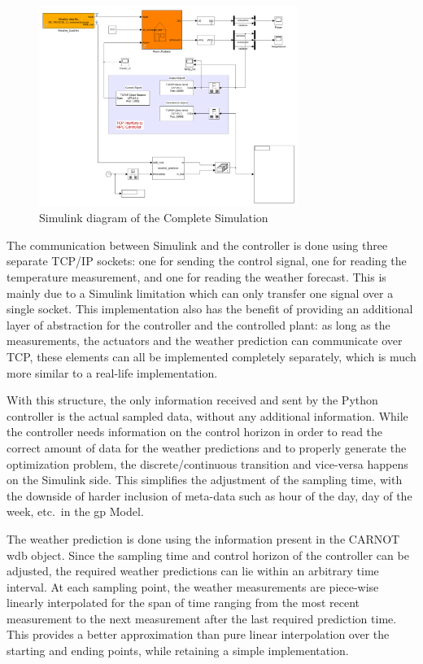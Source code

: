 \begin{figure}[ht]
    \centering
    \includegraphics[width = 0.75\textwidth]{Images/polydome_python.pdf}
    \caption{Simulink diagram of the Complete Simulation}
    \label{fig:Simulink_complete}
\end{figure}

The communication between Simulink and the controller is done using three
separate TCP/IP sockets: one for sending the control signal, one for reading the
temperature measurement, and one for reading the weather forecast. This is
mainly due to a Simulink limitation which can only transfer one signal over a
single socket. This implementation also has the benefit of providing an
additional layer of abstraction for the controller and the controlled plant: as
long as the measurements, the actuators and the weather prediction can
communicate over TCP, these elements can all be implemented completely
separately, which is much more similar to a real-life implementation.

With this structure, the only information received and sent by the Python
controller is the actual sampled data, without any additional information.
While the controller needs information on the control horizon in order to read
the correct amount of data for the weather predictions and to properly generate
the optimization problem, the discrete/continuous transition and vice-versa
happens on the Simulink side. This simplifies the adjustment of the sampling
time, with the downside of harder inclusion of meta-data such as hour of the
day, day of the week, etc.\ in the \acrlong{gp} Model.

The weather prediction is done using the information present in the CARNOT
\acrshort{wdb} object. Since the sampling time and control horizon of the
controller can be adjusted, the required weather predictions can lie within an
arbitrary time interval. At each sampling point, the weather measurements are
piece-wise linearly interpolated for the span of time ranging from the most
recent measurement to the next measurement after the last required prediction
time.  This provides a better approximation than pure linear interpolation over
the starting and ending points, while retaining a simple implementation.

